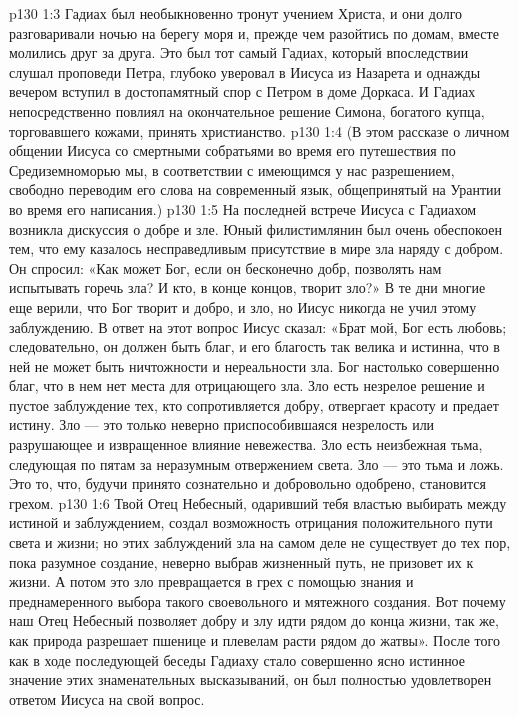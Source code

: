\vs p130 1:3 Гадиах был необыкновенно тронут учением Христа, и они долго разговаривали ночью на берегу моря и, прежде чем разойтись по домам, вместе молились друг за друга. Это был тот самый Гадиах, который впоследствии слушал проповеди Петра, глубоко уверовал в Иисуса из Назарета и однажды вечером вступил в достопамятный спор с Петром в доме Доркаса. И Гадиах непосредственно повлиял на окончательное решение Симона, богатого купца, торговавшего кожами, принять христианство.
\vs p130 1:4 \pc (В этом рассказе о личном общении Иисуса со смертными собратьями во время его путешествия по Средиземноморью мы, в соответствии с имеющимся у нас разрешением, свободно переводим его слова на современный язык, общепринятый на Урантии во время его написания.)
\vs p130 1:5 \pc На последней встрече Иисуса с Гадиахом возникла дискуссия о добре и зле. Юный филистимлянин был очень обеспокоен тем, что ему казалось несправедливым присутствие в мире зла наряду с добром. Он спросил: «Как может Бог, если он бесконечно добр, позволять нам испытывать горечь зла? И кто, в конце концов, творит зло?» В те дни многие еще верили, что Бог творит и добро, и зло, но Иисус никогда не учил этому заблуждению. В ответ на этот вопрос Иисус сказал: «Брат мой, Бог есть любовь; следовательно, он должен быть благ, и его благость так велика и истинна, что в ней не может быть ничтожности и нереальности зла. Бог настолько совершенно благ, что в нем нет места для отрицающего зла. Зло есть незрелое решение и пустое заблуждение тех, кто сопротивляется добру, отвергает красоту и предает истину. Зло --- это только неверно приспособившаяся незрелость или разрушающее и извращенное влияние невежества. Зло есть неизбежная тьма, следующая по пятам за неразумным отвержением света. Зло --- это тьма и ложь. Это то, что, будучи принято сознательно и добровольно одобрено, становится грехом.
\vs p130 1:6 Твой Отец Небесный, одаривший тебя властью выбирать между истиной и заблуждением, создал возможность отрицания положительного пути света и жизни; но этих заблуждений зла на самом деле не существует до тех пор, пока разумное создание, неверно выбрав жизненный путь, не призовет их к жизни. А потом это зло превращается в грех с помощью знания и преднамеренного выбора такого своевольного и мятежного создания. Вот почему наш Отец Небесный позволяет добру и злу идти рядом до конца жизни, так же, как природа разрешает пшенице и плевелам расти рядом до жатвы». После того как в ходе последующей беседы Гадиаху стало совершенно ясно истинное значение этих знаменательных высказываний, он был полностью удовлетворен ответом Иисуса на свой вопрос.
